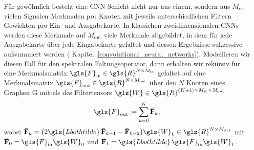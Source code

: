 Für gewöhnlich besteht eine \gls{CNN}-Schicht nicht nur aus einem, sondern aus $M_{\mathrm{in}}$ vielen Signalen \bzw{} Merkmalen pro Knoten mit jeweils unterschiedlichen Filtern \bzw{} Gewichten pro Ein- und Ausgabekarte.
In klassichen zweidimensionalen \glspl{CNN} werden diese Merkmale auf $M_{\mathrm{out}}$ viele Merkmale abgebildet, in dem für jede Ausgabekarte über jede Eingabekarte gefaltet und dessen Ergebnisse sukzessive aufsummiert werden (\vgl{} Kapitel~\ref{convolutional_neural_networks}).
Modellieren wir diesen Fall für den spektralen Faltungsoperator, dann erhalten wir rekursiv für eine Merkmalsmatrix $\gls{F}_{\mathrm{in}} \in \gls{R}^{N \times M_{\mathrm{in}}}$ gefaltet auf eine Merkmalsmatrix $\gls{F}_{\mathrm{out}} \in \gls{R}^{N \times M_{\mathrm{out}}}$ über den $N$ Knoten eines Graphen \gls{G} mittels des Filtertensors $\gls{W} \in \gls{R}^{\left(K+1\right) \times M_{\mathrm{in}} \times M_{\mathrm{out}}}$
\begin{equation*}
  \gls{F}_{\mathrm{out}} \coloneqq \sum_{k=0}^K \ma{\bar F}_k,
\end{equation*}
wobei $\ma{\bar F}_k = \left(2\gls{Lbothtilde}\,\ma{\bar F}_{k -1} -  \ma{\bar F}_{k - 2}\right)\gls{W}_k \in \gls{R}^{N \times M_{\mathrm{out}}}$ mit $\ma{\bar F}_0 = \gls{F}_{\mathrm{in}}\gls{W}_0$ und $\ma{\bar F}_1 = \gls{Lbothtilde}\,\gls{F}_{\mathrm{in}}\gls{W}_1$.
